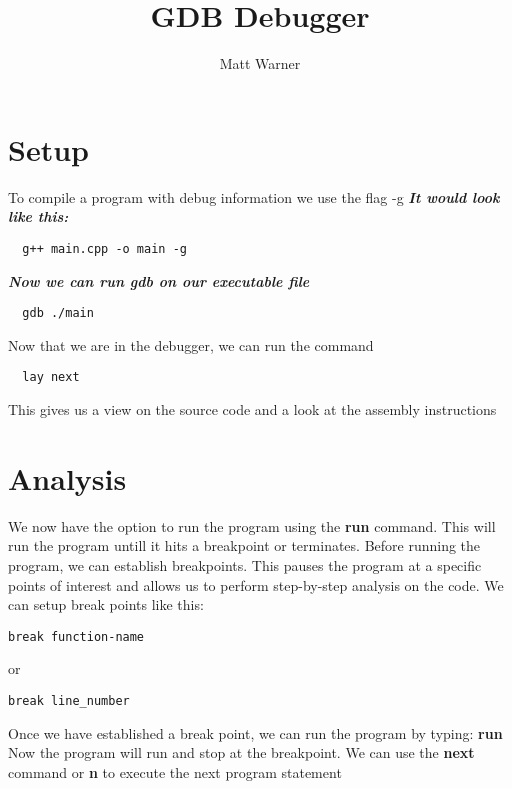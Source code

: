 \documentclass{report}
\title{\Huge{GDB Debugger}}
\author{\huge{Matt Warner}}
\date{\huge{}}
\begin{document}
  \maketitle
  \section{Setup}
  To compile a program with debug information we use the flag -g 
  \bigbreak \noindent
  \textit{\textbf{It would look like this:}}
  \begin{verbatim}
  g++ main.cpp -o main -g
  \end{verbatim}
  \bigbreak \noindent
  \textit{\textbf{Now we can run gdb on our executable file}}
  \begin{verbatim}
  gdb ./main 
  \end{verbatim}
  \bigbreak \noindent
  Now that we are in the debugger, we can run the command
  \begin{verbatim}
  lay next
  \end{verbatim}
  \bigbreak \noindent
  This gives us a view on the source code and a look at the assembly instructions
  \section{Analysis} 
  We now have the option to run the program using the \textbf{run} command. This will run the program untill it hits a breakpoint or terminates.
\bigbreak \noindent
Before running the program, we can establish breakpoints. This pauses the program at a specific points of interest and allows us to perform step-by-step analysis on the code. We can setup break points like this:
\begin{verbatim}
break function-name
\end{verbatim}
or
\begin{verbatim}
break line_number
\end{verbatim}
\bigbreak \noindent
Once we have established a break point, we can run the program by typing: \textbf{run}
\bigbreak \noindent
Now the program will run and stop at the breakpoint. We can use the \textbf{next} command or \textbf{n} to execute the next program statement
\end{document}
